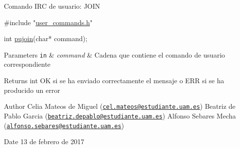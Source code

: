 Comando I\-R\-C de usuario\-: J\-O\-I\-N


\begin{DoxyCode}
\textcolor{preprocessor}{#include "\hyperlink{user__commands_8h}{user\_commands.h}"}

\textcolor{keywordtype}{int} \hyperlink{user__commands_8h_add059d444d6e29f6e18f67bda6c21878}{pujoin}(\textcolor{keywordtype}{char}* command);
\end{DoxyCode}



\begin{DoxyParams}[1]{Parameters}
\mbox{\tt in}  & {\em command} & Cadena que contiene el comando de usuario correspondiente\\
\hline
\end{DoxyParams}
\begin{DoxyReturn}{Returns}
int O\-K si se ha enviado correctamente el mensaje o E\-R\-R si se ha producido un error
\end{DoxyReturn}
\begin{DoxyAuthor}{Author}
Celia Mateos de Miguel (\href{mailto:cel.mateos@estudiante.uam.es}{\tt cel.\-mateos@estudiante.\-uam.\-es}) Beatriz de Pablo Garcia (\href{mailto:beatriz.depablo@estudiante.uam.es}{\tt beatriz.\-depablo@estudiante.\-uam.\-es}) Alfonso Sebares Mecha (\href{mailto:alfonso.sebares@estudiante.uam.es}{\tt alfonso.\-sebares@estudiante.\-uam.\-es})
\end{DoxyAuthor}
\begin{DoxyDate}{Date}
13 de febrero de 2017
\end{DoxyDate}


 
